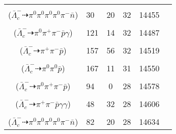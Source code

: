 \documentclass[landscape]{article}
\newcounter{rownumbers}
\newcommand\rn{\stepcounter{rownumbers}\arabic{rownumbers}}
\newcommand{\EOL}{\\} %
\newcommand{\topoTags}[1]{#1} %
\begin{document}
\begin{longtable}{clcccc}
\rn & \makecell[l]{ $ 
\bar{\Lambda}_{c}^{-} \rightarrow \pi^{-} \eta \bar{\Lambda} ,
\eta \rightarrow \pi^{0} \pi^{0} \pi^{0} ,
\bar{\Lambda} \rightarrow \pi^{0} \bar{n} 
$ \\ ($
\bar{\Lambda}_{c}^{-} \dashrightarrow \pi^{0} \pi^{0} \pi^{0} \pi^{0} \pi^{-} \bar{n} 
$) } & \topoTags{30 & 20 & }32 & 14455 \EOL

\rn & \makecell[l]{ $ 
\bar{\Lambda}_{c}^{-} \rightarrow \pi^{-} \omega \bar{\Lambda} ,
\omega \rightarrow \pi^{0} \gamma ,
\bar{\Lambda} \rightarrow \pi^{+} \bar{p} 
$ \\ ($
\bar{\Lambda}_{c}^{-} \dashrightarrow \pi^{0} \pi^{+} \pi^{-} \bar{p} \gamma 
$) } & \topoTags{121 & 14 & }32 & 14487 \EOL

\rn & \makecell[l]{ $ 
\bar{\Lambda}_{c}^{-} \rightarrow K^{0} \bar{p} ,
K^{0} \rightarrow K_{S}^{0} ,
K_{S}^{0} \rightarrow \pi^{+} \pi^{-} 
$ \\ ($
\bar{\Lambda}_{c}^{-} \dashrightarrow \pi^{+} \pi^{-} \bar{p} 
$) } & \topoTags{157 & 56 & }32 & 14519 \EOL

\rn & \makecell[l]{ $ 
\bar{\Lambda}_{c}^{-} \rightarrow K^{0} \bar{p} ,
K^{0} \rightarrow K_{S}^{0} ,
K_{S}^{0} \rightarrow \pi^{0} \pi^{0} 
$ \\ ($
\bar{\Lambda}_{c}^{-} \dashrightarrow \pi^{0} \pi^{0} \bar{p} 
$) } & \topoTags{167 & 11 & }31 & 14550 \EOL

\rn & \makecell[l]{ $ 
\bar{\Lambda}_{c}^{-} \rightarrow \rho^{-} \bar{\Delta}^{0} ,
\rho^{-} \rightarrow \pi^{0} \pi^{-} ,
\bar{\Delta}^{0} \rightarrow \pi^{+} \bar{p} 
$ \\ ($
\bar{\Lambda}_{c}^{-} \dashrightarrow \pi^{0} \pi^{+} \pi^{-} \bar{p} 
$) } & \topoTags{94 & 0 & }28 & 14578 \EOL

\rn & \makecell[l]{ $ 
\bar{\Lambda}_{c}^{-} \rightarrow \eta \bar{\Sigma}^{*-} ,
\eta \rightarrow \gamma \gamma ,
\bar{\Sigma}^{*-} \rightarrow \pi^{-} \bar{\Lambda} ,
\bar{\Lambda} \rightarrow \pi^{+} \bar{p} 
$ \\ ($
\bar{\Lambda}_{c}^{-} \dashrightarrow \pi^{+} \pi^{-} \bar{p} \gamma \gamma 
$) } & \topoTags{48 & 32 & }28 & 14606 \EOL

\rn & \makecell[l]{ $ 
\bar{\Lambda}_{c}^{-} \rightarrow \eta \bar{\Sigma}^{*-} ,
\eta \rightarrow \pi^{0} \pi^{0} \pi^{0} ,
\bar{\Sigma}^{*-} \rightarrow \pi^{-} \bar{\Lambda} ,
\bar{\Lambda} \rightarrow \pi^{0} \bar{n} 
$ \\ ($
\bar{\Lambda}_{c}^{-} \dashrightarrow \pi^{0} \pi^{0} \pi^{0} \pi^{0} \pi^{-} \bar{n} 
$) } & \topoTags{82 & 20 & }28 & 14634 \EOL


\end{longtable}
\end{document}
